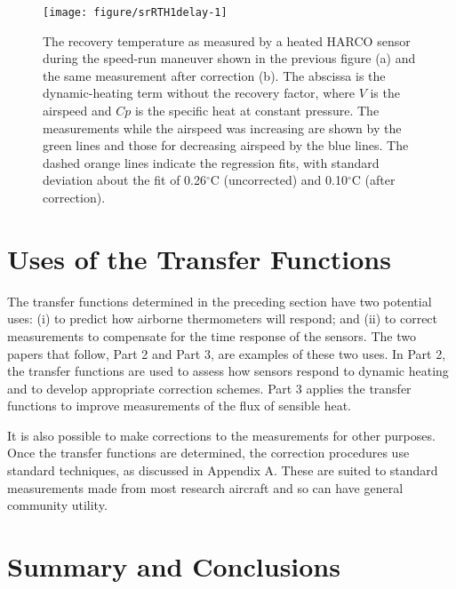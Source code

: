 \documentclass[11pt,twoside,american,12pt,twoside,american]{article}\usepackage[]{graphicx}\usepackage[]{color}
\makeatletter
\def\maxwidth{ %
  \ifdim\Gin@nat@width>\linewidth
    \linewidth
  \else
    \Gin@nat@width
  \fi
}
\newenvironment{knitrout}{}{} %
\let\stdsection\section
\renewcommand{\section}{\newpage\stdsection}
\makeatother
\begin{document}
\begin{knitrout}
\color{fgcolor}\begin{figure}

{\centering \texttt{[image: figure/srRTH1delay-1]} 

}

\caption{The recovery temperature as measured by a heated HARCO sensor during the speed-run maneuver shown in the previous figure (a) and the same measurement after correction (b). The abscissa is the dynamic-heating term without the recovery factor, where $V$ is the airspeed and $Cp$ is the specific heat at constant pressure. The measurements while the airspeed was increasing are shown by the green lines and those for decreasing airspeed by the blue lines. The dashed orange lines indicate the regression fits, with standard deviation about the fit of 0.26$^{\circ}$C (uncorrected) and 0.10$^{\circ}$C (after correction).}\label{fig:srRTH1delay}
\end{figure}


\end{knitrout}



\clearpage{}

\section{Uses of the Transfer Functions}

The transfer functions determined in the preceding section have two
potential uses: (i) to predict how airborne thermometers will respond;
and (ii) to correct measurements to compensate for the time response
of the sensors. The two papers that follow, Part 2 and Part 3, are
examples of these two uses. In Part 2, the transfer functions are
used to assess how sensors respond to dynamic heating and to develop
appropriate correction schemes. Part 3 applies the transfer functions
to improve measurements of the flux of sensible heat.

It is also possible to make corrections to the measurements for other
purposes. Once the transfer functions are determined, the correction
procedures use standard techniques, as discussed in Appendix A. These
are suited to standard measurements made from most research aircraft
and so can have general community utility.

\section{Summary and Conclusions}
\end{document}
